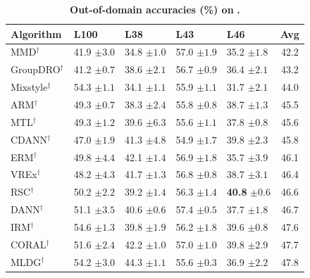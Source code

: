 \begin{table}[H]
\centering
\small
\renewcommand{\arraystretch}{1.1}
\caption{\small\textbf{Out-of-domain accuracies (\%) on} \textbf{.}}
\begin{tabular}{lllll|c}
\toprule
\textbf{Algorithm} & \textbf{L100} & \textbf{L38} & \textbf{L43} & \textbf{L46} & \textbf{Avg} \\
\midrule
MMD$^\dagger$ & 41.9 \scriptsize$\pm3.0$ & 34.8 \scriptsize$\pm1.0$ & 57.0 \scriptsize$\pm1.9$ & 35.2 \scriptsize$\pm1.8$ & 42.2 \\
GroupDRO$^\dagger$ & 41.2 \scriptsize$\pm0.7$ & 38.6 \scriptsize$\pm2.1$ & 56.7 \scriptsize$\pm0.9$ & 36.4 \scriptsize$\pm2.1$ & 43.2 \\
Mixstyle$^\ddagger$ & 54.3 \scriptsize$\pm1.1$ & 34.1 \scriptsize$\pm1.1$ & 55.9 \scriptsize$\pm1.1$ & 31.7 \scriptsize$\pm2.1$ & 44.0 \\
ARM$^\dagger$ & 49.3 \scriptsize$\pm0.7$ & 38.3 \scriptsize$\pm2.4$ & 55.8 \scriptsize$\pm0.8$ & 38.7 \scriptsize$\pm1.3$ & 45.5 \\
MTL$^\dagger$ & 49.3 \scriptsize$\pm1.2$ & 39.6 \scriptsize$\pm6.3$ & 55.6 \scriptsize$\pm1.1$ & 37.8 \scriptsize$\pm0.8$ & 45.6 \\
CDANN$^\dagger$ & 47.0 \scriptsize$\pm1.9$ & 41.3 \scriptsize$\pm4.8$ & 54.9 \scriptsize$\pm1.7$ & 39.8 \scriptsize$\pm2.3$ & 45.8 \\
ERM$^\dagger$ & 49.8 \scriptsize$\pm4.4$ & 42.1 \scriptsize$\pm1.4$ & 56.9 \scriptsize$\pm1.8$ & 35.7 \scriptsize$\pm3.9$ & 46.1 \\
VREx$^\dagger$ & 48.2 \scriptsize$\pm4.3$ & 41.7 \scriptsize$\pm1.3$ & 56.8 \scriptsize$\pm0.8$ & 38.7 \scriptsize$\pm3.1$ & 46.4 \\
RSC$^\dagger$ & 50.2 \scriptsize$\pm2.2$ & 39.2 \scriptsize$\pm1.4$ & 56.3 \scriptsize$\pm1.4$ & \textbf{40.8} \scriptsize$\pm0.6$ & 46.6 \\
DANN$^\dagger$ & 51.1 \scriptsize$\pm3.5$ & 40.6 \scriptsize$\pm0.6$ & 57.4 \scriptsize$\pm0.5$ & 37.7 \scriptsize$\pm1.8$ & 46.7 \\
IRM$^\dagger$ & 54.6 \scriptsize$\pm1.3$ & 39.8 \scriptsize$\pm1.9$ & 56.2 \scriptsize$\pm1.8$ & 39.6 \scriptsize$\pm0.8$ & 47.6 \\
CORAL$^\dagger$ & 51.6 \scriptsize$\pm2.4$ & 42.2 \scriptsize$\pm1.0$ & 57.0 \scriptsize$\pm1.0$ & 39.8 \scriptsize$\pm2.9$ & 47.7 \\
MLDG$^\dagger$ & 54.2 \scriptsize$\pm3.0$ & 44.3 \scriptsize$\pm1.1$ & 55.6 \scriptsize$\pm0.3$ & 36.9 \scriptsize$\pm2.2$ & 47.8 \\

\end{tabular}
\end{table}
